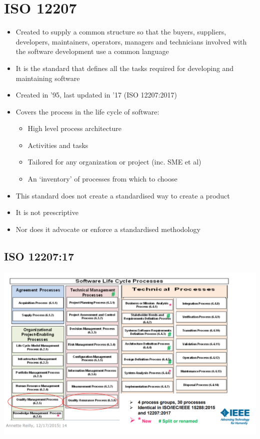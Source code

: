 \documentclass{article}[18pt]
\begin{document}
\section{ISO 12207}
\begin{itemize}
	\item Created to supply a common structure so that the buyers, suppliers, developers, maintainers, operators, managers and technicians involved with the software development use a common language
	\item It is the standard that defines all the tasks required for developing and maintaining software
	\item Created in ’95, last updated in ’17 (ISO 12207:2017)
	\item Covers the process in the life cycle of software:
	\begin{itemize}
		\item High level process architecture
		\item Activities and tasks
		\item Tailored for any organization or project (inc. SME et al)
		\item An ‘inventory’ of processes from which to choose
	\end{itemize}
	\item This standard does not create a standardised way to create a product
	\item It is not prescriptive
	\item Nor does it advocate or enforce a standardised methodology
\end{itemize}
\subsection{ISO 12207:17}
\begin{center}
	\includegraphics[scale=0.7]{ISO12207:17}
\end{center}
\end{document}
